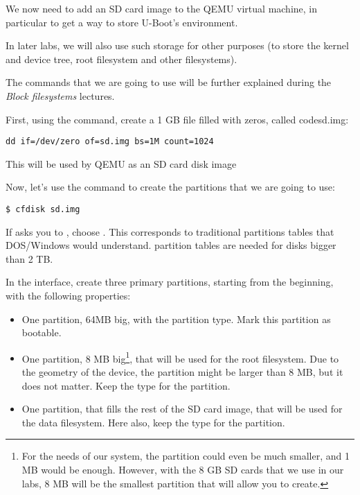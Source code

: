 We now need to add an SD card image to the QEMU virtual machine,
in particular to get a way to store U-Boot's environment.

In later labs, we will also use such storage for other purposes
(to store the kernel and device tree, root filesystem and other
filesystems).

The commands that we are going to use will be further explained
during the {\em Block filesystems} lectures.

First, using the  command, create a 1 GB file
filled with zeros, called code{sd.img}:

\begin{verbatim}
dd if=/dev/zero of=sd.img bs=1M count=1024
\end{verbatim}

This will be used by QEMU as an SD card disk image

Now, let's use the  command to create the partitions that
we are going to use:

\begin{verbatim}
$ cfdisk sd.img
\end{verbatim}

If  asks you to , choose
. This corresponds to traditional partitions tables that DOS/Windows
would understand.  partition tables are needed for disks bigger
than 2 TB.

In the  interface, create three primary partitions,
starting from the beginning, with the following properties:

\begin{itemize}
\item One partition, 64MB big, with the  partition type.
      Mark this partition as bootable.

\item One partition, 8 MB big\footnote{For the needs of our system,
  the partition could even be much smaller, and 1 MB would be enough.
  However, with the 8 GB SD cards that we use in our labs, 8 MB will
  be the smallest partition that  will allow you to
  create.}, that will be used for the root filesystem. Due to the
  geometry of the device, the partition might be larger than 8 MB,
  but it does not matter. Keep the  type for the
  partition.

\item One partition, that fills the rest of the SD card image, that will be
  used for the data filesystem. Here also, keep the  type
  for the partition.
\end{itemize}

